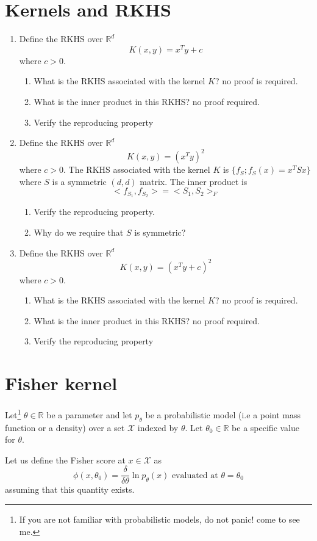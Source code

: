 \documentclass{article}[12pt]
\begin{document}
\section{Kernels and RKHS}
\begin{enumerate}
\item Define the RKHS  over $\mathbb{R}^d$
$$K(x,y)=x^Ty+c$$
where $c>0$. 
\begin{enumerate}
\item
What is the RKHS associated with the kernel $K$? no proof is required. 
\item 
What is the inner product in this RKHS? no proof required.  
\item 
Verify the reproducing property
\end{enumerate}
\item Define the RKHS  over $\mathbb{R}^d$
$$K(x,y)=(x^Ty)^2$$
where $c>0$. 
The RKHS associated with the kernel $K$ is $\{f_S;f_S(x)=x^T S x\}$ where $S$ is a symmetric $(d,d)$ matrix. The inner product is
$$<f_{S_1},f_{S_2}>=<S_1,S_2>_F$$
\begin{enumerate}
\item
Verify the reproducing property. 
\item 
Why do we require that $S$ is symmetric?
\end{enumerate}
\item Define the RKHS  over $\mathbb{R}^d$
$$K(x,y)=(x^Ty+c)^2$$
where $c>0$. 
\begin{enumerate}
\item
What is the RKHS associated with the kernel $K$? no proof is required. 
\item 
What is the inner product in this RKHS? no proof required.  
\item 
Verify the reproducing property
\end{enumerate}
\end{enumerate}
\section{Fisher kernel} 
Let\footnote{If you are not familiar with probabilistic models, do not panic! come to see me.} $\theta \in \mathbb{R}$ be a parameter and let $p_\theta$ be a probabilistic model (i.e a point mass function or a density) over a set $\mathcal{X}$ indexed by $\theta$. Let $\theta_0 \in \mathbb{R}$ be a specific value for $\theta$.

Let us define the Fisher score at $x \in \mathcal{X}$ as
\begin{equation}
\phi(x,\theta_0) = \frac{\delta}{\delta \theta} \ln p_\theta(x) \mbox{ evaluated at } \theta=\theta_0
\end{equation}
assuming that this quantity exists. 
\end{document}
